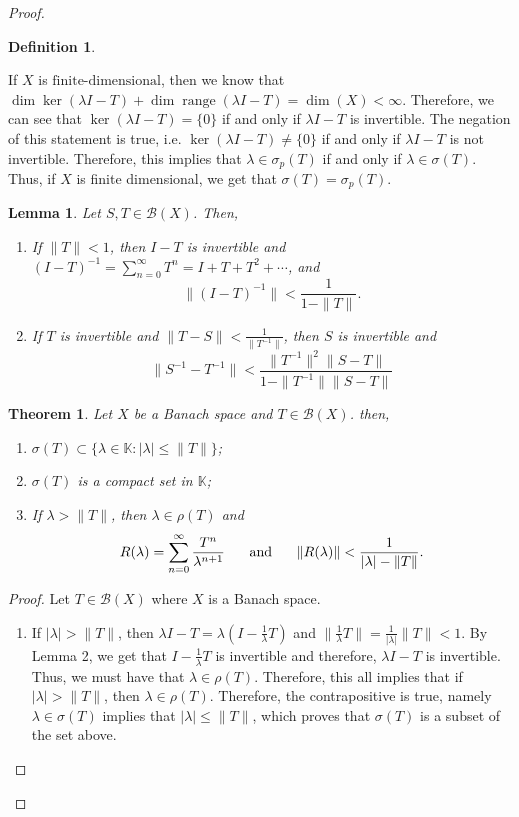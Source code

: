 \documentclass[oneside]{book}
\newtheorem{theorem}{Theorem}
\newtheorem{lemma}{Lemma}
\newtheorem{definition}{Definition}
\def\K{\mathbb{K}}
\newcommand{\B}{\mathscr{B}}
\newcommand{\fd}{{\text{finite-dimensional}}}
\DeclareMathOperator{\range}{range}
\newcommand{\sumo}{\sum\limits_{n = 0}^{\infty}}
\newcommand{\sbs}{\subset}
\begin{document}
\begin{proof}
\begin{definition}
\end{definition}
If $X$ is $\fd$, then we know that $\dim \ker(\lambda I - T) + \dim\range(\lambda I - T) = \dim(X) < \infty$. Therefore, we can see that $\ker(\lambda I - T) = \{ 0 \}$ if and only if $\lambda I - T$ is invertible. The negation of this statement is true, i.e. $\ker(\lambda I - T) \neq \{ 0 \}$ if and only if $\lambda I - T$ is not invertible. Therefore, this implies that $\lambda \in \sigma_p(T)$ if and only if $\lambda \in \sigma(T)$. Thus, if $X$ is finite dimensional, we get that $\sigma(T) = \sigma_p(T)$.
\begin{lemma}
Let $S, T \in \B(X)$. Then, 
\begin{enumerate}
\item[(a)] If $\| T \| < 1$, then $I - T$ is invertible and $(I  - T)^{-1} = \sumo T^n = I + T + T^2 + \cdots$, and 
\[ \| (I - T)^{-1} \| < \dfrac{1}{1 - \| T \|}.\]
\item[(b)] If $T$ is invertible and $\| T - S \| < \frac{1}{\| T^{-1} \|}$, then $S$ is invertible and 
\[ \| S^{-1} - T^{-1} \| < \dfrac{\| T^{-1} \|^2 \| S - T \| }{1 - \| T^{-1} \| \| S - T \|}\]
\end{enumerate}
\end{lemma}
\begin{theorem}
Let $X$ be a Banach space and $T \in \B(X)$. then, 
\begin{enumerate}
\item[(a)] $\sigma(T) \sbs \{ \lambda \in \K : |\lambda| \leq \| T \| \}$;
\item[(b)] $\sigma(T)$ is a compact set in $\K$;
\item[(c)] If $\lambda > \| T \|$, then $\lambda \in \rho(T)$ and 
\[ R(\lambda) = \sumo \frac{T^n}{\lambda^{n+1}} \hspace{5mm} \text{ and } \hspace{5mm} \| R(\lambda) \| < \frac{1}{|\lambda| - \| T \|}.\]
\end{enumerate}
\end{theorem}
\begin{proof}
Let $T \in \B(X)$ where $X$ is a Banach space.
\begin{enumerate}
\item[(a)] If $|\lambda | > \| T \|$, then $\lambda I - T = \lambda (I - \frac{1}{\lambda} T)$ and $\| \frac{1}{\lambda} T \| = \frac{1}{|\lambda |} \| T \| < 1$. By Lemma 2, we get that $I - \frac{1}{\lambda} T$ is invertible and therefore, $\lambda I - T$ is invertible. Thus, we must have that $\lambda \in \rho(T)$. Therefore, this all implies that if $|\lambda | > \| T \|$, then $\lambda \in \rho(T)$. Therefore, the contrapositive is true, namely $\lambda \in \sigma(T)$ implies that $|\lambda | \leq \| T \|$, which proves that $\sigma(T)$ is a subset of the set above. 

\end{enumerate}
\end{proof}
\end{proof}
\end{document}
